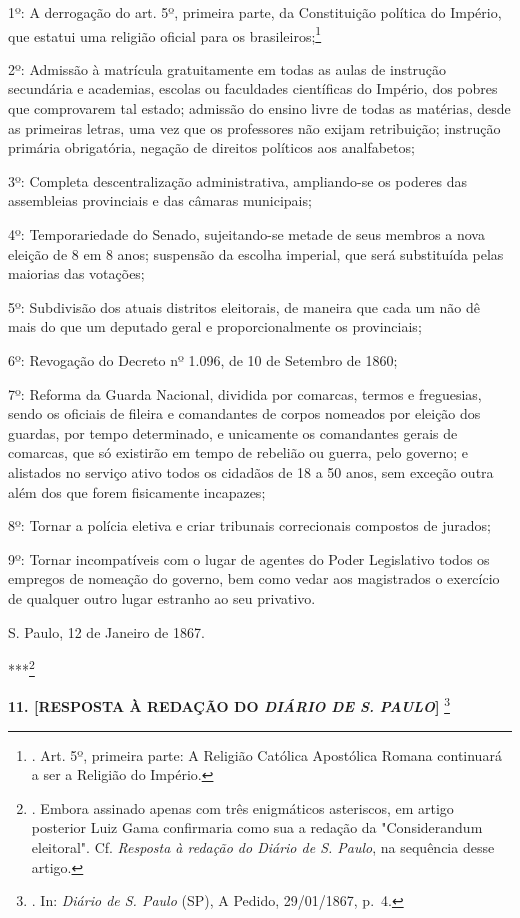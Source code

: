 1º: A derrogação do art. 5º, primeira parte, da Constituição política do
Império, que estatui uma religião oficial para os
brasileiros;\footnote{. Art. 5º, primeira parte: A Religião Católica
  Apostólica Romana continuará a ser a Religião do Império.}

2º: Admissão à matrícula gratuitamente em todas as aulas de instrução
secundária e academias, escolas ou faculdades científicas do Império,
dos pobres que comprovarem tal estado; admissão do ensino livre de todas
as matérias, desde as primeiras letras, uma vez que os professores não
exijam retribuição; instrução primária obrigatória, negação de direitos
políticos aos analfabetos;

3º: Completa descentralização administrativa, ampliando-se os poderes
das assembleias provinciais e das câmaras municipais;

4º: Temporariedade do Senado, sujeitando-se metade de seus membros a
nova eleição de 8 em 8 anos; suspensão da escolha imperial, que será
substituída pelas maiorias das votações;

5º: Subdivisão dos atuais distritos eleitorais, de maneira que cada um
não dê mais do que um deputado geral e proporcionalmente os provinciais;

6º: Revogação do Decreto nº 1.096, de 10 de Setembro de 1860;

7º: Reforma da Guarda Nacional, dividida por comarcas, termos e
freguesias, sendo os oficiais de fileira e comandantes de corpos
nomeados por eleição dos guardas, por tempo determinado, e unicamente os
comandantes gerais de comarcas, que só existirão em tempo de rebelião ou
guerra, pelo governo; e alistados no serviço ativo todos os cidadãos de
18 a 50 anos, sem exceção outra além dos que forem fisicamente
incapazes;

8º: Tornar a polícia eletiva e criar tribunais correcionais compostos de
jurados;

9º: Tornar incompatíveis com o lugar de agentes do Poder Legislativo
todos os empregos de nomeação do governo, bem como vedar aos magistrados
o exercício de qualquer outro lugar estranho ao seu privativo.

S. Paulo, 12 de Janeiro de 1867.

***\footnote{. Embora assinado apenas com três enigmáticos asteriscos,
  em artigo posterior Luiz Gama confirmaria como sua a redação da
  "Considerandum eleitoral". Cf. \emph{Resposta à redação do Diário de
  S. Paulo}, na sequência desse artigo.}

\textbf{11. {[}RESPOSTA À REDAÇÃO DO \emph{DIÁRIO DE S. PAULO}{]}}
\footnote{. In: \emph{Diário de S. Paulo} (SP), A Pedido, 29/01/1867,
  p.~4.}

